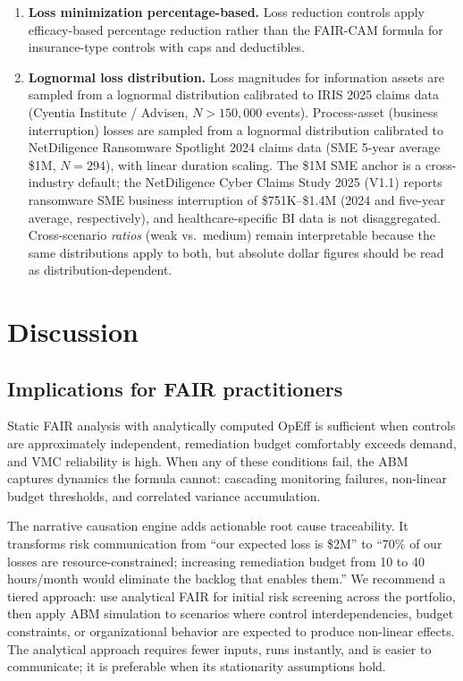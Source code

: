 \documentclass[11pt,a4paper]{article}
\begin{document}
\begin{enumerate}[nosep]
    \item \textbf{Loss minimization percentage-based.} Loss reduction controls apply efficacy-based percentage reduction rather than the FAIR-CAM formula for insurance-type controls with caps and deductibles.

    \item \textbf{Lognormal loss distribution.} Loss magnitudes for information assets are sampled from a lognormal distribution calibrated to IRIS 2025 claims data (Cyentia Institute / Advisen, $N{>}150{,}000$ events). Process-asset (business interruption) losses are sampled from a lognormal distribution calibrated to NetDiligence Ransomware Spotlight 2024 claims data (SME 5-year average \$1M, $N=294$), with linear duration scaling. The \$1M SME anchor is a cross-industry default; the NetDiligence Cyber Claims Study 2025 (V1.1) reports ransomware SME business interruption of \$751K--\$1.4M (2024 and five-year average, respectively), and healthcare-specific BI data is not disaggregated. Cross-scenario \emph{ratios} (weak vs.\ medium) remain interpretable because the same distributions apply to both, but absolute dollar figures should be read as distribution-dependent.

\end{enumerate}



\section{Discussion}
\label{sec:discussion}

\subsection{Implications for FAIR practitioners}

Static FAIR analysis with analytically computed OpEff is sufficient when controls are approximately independent, remediation budget comfortably exceeds demand, and VMC reliability is high. When any of these conditions fail, the ABM captures dynamics the formula cannot: cascading monitoring failures, non-linear budget thresholds, and correlated variance accumulation.

The narrative causation engine adds actionable root cause traceability. It transforms risk communication from ``our expected loss is \$2M'' to ``70\% of our losses are resource-constrained; increasing remediation budget from 10 to 40 hours/month would eliminate the backlog that enables them.'' We recommend a tiered approach: use analytical FAIR for initial risk screening across the portfolio, then apply ABM simulation to scenarios where control interdependencies, budget constraints, or organizational behavior are expected to produce non-linear effects. The analytical approach requires fewer inputs, runs instantly, and is easier to communicate; it is preferable when its stationarity assumptions hold.
\end{document}

